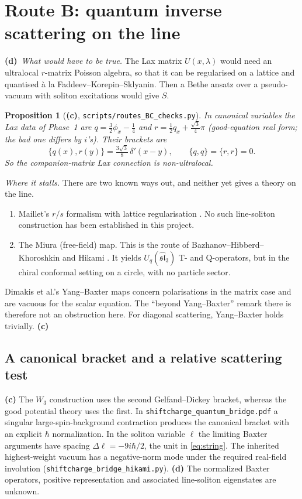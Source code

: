 \documentclass[11pt,a4paper]{article}
\newcommand{\Lc}{\textsf{\textbf{(c)}}\xspace}
\newcommand{\Ld}{\textsf{\textbf{(d)}}\xspace}
\newcommand{\script}[1]{\texttt{scripts/#1}}
\newcommand{\file}[1]{\nolinkurl{#1}}
\newtheorem{proposition}{Proposition}[section]
\theoremstyle{remark}\newtheorem{remark}[proposition]{Remark}
\begin{document}
\section{Route B: quantum inverse scattering on the line}

\Ld\ \emph{What would have to be true.} The Lax matrix $U(x,\lambda)$ would need an ultralocal $r$-matrix Poisson algebra, so that it can be regularised on a lattice and quantised à la Faddeev--Korepin--Sklyanin. Then a Bethe ansatz over a pseudo-vacuum with soliton excitations would give $S$.

\begin{proposition}[\Lc, \script{routes\_\allowbreak BC\_\allowbreak checks.py}]
In canonical variables the Lax data of Phase~1 are $q=\tfrac32\phi_x-\tfrac14$ and $r=\tfrac12q_x+\tfrac{\sqrt3}4\pi$ (good-equation real form; the bad one differs by $i$'s). Their brackets are
\[
\{q(x),r(y)\}=\tfrac{3\sqrt3}{8}\,\delta'(x-y),\qquad\{q,q\}=\{r,r\}=0 .
\]
So the companion-matrix Lax connection is \emph{non-ultralocal}.
\end{proposition}

\emph{Where it stalls.} There are two known ways out, and neither yet gives a theory on the line.
\begin{enumerate}
\item Maillet's $r/s$ formalism with lattice regularisation \cite{Maillet}. No such line-soliton construction has been established in this project.
\item The Miura (free-field) map. This is the route of Bazhanov--Hibberd--Khoroshkin \cite{BHK} and Hikami \cite{Hikami}. It yields $U_q(\widehat{\mathfrak{sl}}_3)$ T- and Q-operators, but in the chiral conformal setting on a circle, with no particle sector.
\end{enumerate}

Dimakis et al.'s Yang--Baxter maps \cite{DMHC} concern polarisations in the matrix case and are vacuous for the scalar equation. The ``beyond Yang--Baxter'' remark there is therefore not an obstruction here. For diagonal scattering, Yang--Baxter holds trivially. \Lc

\subsection{A canonical bracket and a relative scattering test}\label{sec:bridge}
\Lc The $W_3$ construction uses the second Gelfand--Dickey bracket, whereas
the good potential theory uses the first. In \file{shiftcharge_quantum_bridge.pdf}
a singular large-spin-background contraction produces the canonical bracket
with an explicit $\hbar$ normalization. In the soliton variable $\ell$ the
limiting Baxter arguments have spacing $\Delta\ell=-9i\hbar/2$, the unit in
\eqref{eq:string}. The inherited highest-weight vacuum has a negative-norm
mode under the required real-field involution (\file{shiftcharge_bridge_hikami.py}).
\Ld The normalized Baxter operators, positive representation and associated
line-soliton eigenstates are unknown.
\end{document}
